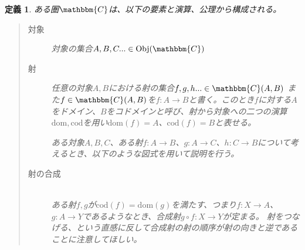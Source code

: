 \documentclass[dvipdfmx]{jsarticle}
\newcommand{\cat}[1]{\mathbbm{#1}}
\newcommand{\arrow}{\rightarrow}
\newcommand{\obj}[1]{\mathrm{Obj}(\cat{#1})}
\newcommand{\mor}[3]{#1:#2\arrow #3}
\newcommand{\dom}{\mathrm{dom}}
\newcommand{\cod}{\mathrm{cod}}
\newcommand{\arset}[3]{\cat{#1}(#2,#3)}
\newtheorem{define}{定義}[section]
\numberwithin{proof}{subsection}
\numberwithin{prop}{subsection}
\numberwithin{define}{subsection}
\begin{document}
	\begin{define}
		ある圏$\cat{C}$は、以下の要素と演算、公理から構成される。
		\begin{quote}
			\begin{description}
			\item[対象] 対象の集合$A,B,C...\in\obj{C}$
			\item[射] 任意の対象$A,B$における射の集合$f,g,h...\in\arset{C}{A}{B}$
			また$f\in\arset{C}{A}{B}$を$\mor{f}{A}{B}$と書く。このとき$f$に対する$A$をドメイン、$B$をコドメインと呼び、射から対象への二つの演算$\dom,\cod$を用い$\dom(f)=A$、$\cod(f)=B$と表せる。

			ある対象$A,B,C$、ある射$\mor{f}{A}{B}$、$\mor{g}{A}{C}$、$\mor{h}{C}{B}$について考えるとき、以下のような図式を用いて説明を行う。
			\begin{center}
			\end{center}

			\item[射の合成]~\\ ある射$f,g$が$\cod(f)=\dom(g)$を満たす、つまり$\mor{f}{X}{A}$、$\mor{g}{A}{Y}$であるようなとき、合成射$\mor{g\circ f}{X}{Y}$が定まる。
			射をつなげる、という直感に反して合成射の射の順序が射の向きと逆であることに注意してほしい。


\end{description}
\end{quote}
\end{define}
\end{document}
